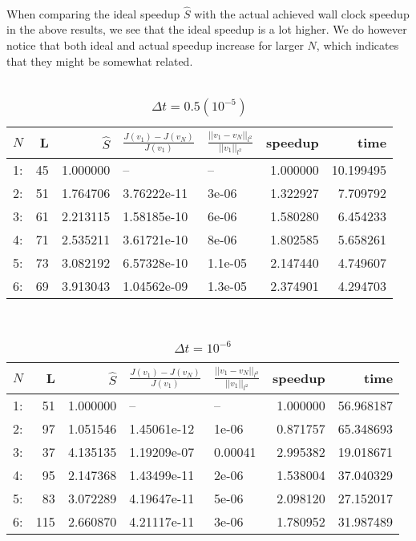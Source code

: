 \\
When comparing the ideal speedup $\hat S$ with the actual achieved wall clock speedup in the above results, we see that the ideal speedup is a lot higher. We do however notice that both ideal and actual speedup increase for larger $N$, which indicates that they might be somewhat related.
\\
\\
\begin{table}[h]
\centering
\caption{$\Delta t = 0.5(10^{-5})$}
\begin{tabular}{lrrllrr}
\toprule
{} $N$&   L &        $\hat S$ &         $\frac{J(v_1)-J(v_N)}{J(v_1)}$ &    $\frac{||v_1-v_N||_{l^2}}{||v_1||_{l^2}}$&speedup &       time \\
\midrule
1: &  45 &  1.000000 &           -- &       -- &  1.000000 &  10.199495 \\
2: &  51 &  1.764706 &  3.76222e-11 &    3e-06 &  1.322927 &   7.709792 \\
3: &  61 &  2.213115 &  1.58185e-10 &    6e-06 &  1.580280 &   6.454233 \\
4: &  71 &  2.535211 &  3.61721e-10 &    8e-06 &  1.802585 &   5.658261 \\
5: &  73 &  3.082192 &  6.57328e-10 &  1.1e-05 &  2.147440 &   4.749607 \\
6: &  69 &  3.913043 &  1.04562e-09 &  1.3e-05 &  2.374901 &   4.294703 \\
\bottomrule
\end{tabular}
\end{table}
\\
\begin{table}[h]
\centering
\caption{$\Delta t = 10^{-6}$}
\begin{tabular}{lrrllrr}
\toprule
{} $N$&   L &        $\hat S$ &          $\frac{J(v_1)-J(v_N)}{J(v_1)}$ &    $\frac{||v_1-v_N||_{l^2}}{||v_1||_{l^2}}$&speedup &       time \\
\midrule
1: &   51 &  1.000000 &           -- &       -- &  1.000000 &  56.968187 \\
2: &   97 &  1.051546 &  1.45061e-12 &    1e-06 &  0.871757 &  65.348693 \\
3: &   37 &  4.135135 &  1.19209e-07 &  0.00041 &  2.995382 &  19.018671 \\
4: &   95 &  2.147368 &  1.43499e-11 &    2e-06 &  1.538004 &  37.040329 \\
5: &   83 &  3.072289 &  4.19647e-11 &    5e-06 &  2.098120 &  27.152017 \\
6: &  115 &  2.660870 &  4.21117e-11 &    3e-06 &  1.780952 &  31.987489 \\
\bottomrule
\end{tabular}
\end{table}
